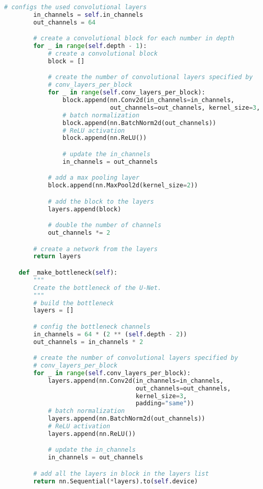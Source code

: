 \begin{lstlisting}[language=Python, caption={U-Net architecture for semantic segmentation}]
        # configs the used convolutional layers
        in_channels = self.in_channels
        out_channels = 64

        # create a convolutional block for each number in depth
        for _ in range(self.depth - 1):
            # create a convolutional block
            block = []

            # create the number of convolutional layers specified by
            # conv_layers_per_block
            for _ in range(self.conv_layers_per_block):
                block.append(nn.Conv2d(in_channels=in_channels,
                             out_channels=out_channels, kernel_size=3, padding="same"))
                # batch normalization
                block.append(nn.BatchNorm2d(out_channels))
                # ReLU activation
                block.append(nn.ReLU())

                # update the in_channels
                in_channels = out_channels

            # add a max pooling layer
            block.append(nn.MaxPool2d(kernel_size=2))

            # add the block to the layers
            layers.append(block)

            # double the number of channels
            out_channels *= 2

        # create a network from the layers
        return layers

    def _make_bottleneck(self):
        """
        Create the bottleneck of the U-Net.
        """
        # build the bottleneck
        layers = []

        # config the bottleneck channels
        in_channels = 64 * (2 ** (self.depth - 2))
        out_channels = in_channels * 2

        # create the number of convolutional layers specified by
        # conv_layers_per_block
        for _ in range(self.conv_layers_per_block):
            layers.append(nn.Conv2d(in_channels=in_channels,
                                    out_channels=out_channels,
                                    kernel_size=3,
                                    padding="same"))
            # batch normalization
            layers.append(nn.BatchNorm2d(out_channels))
            # ReLU activation
            layers.append(nn.ReLU())

            # update the in_channels
            in_channels = out_channels

        # add all the layers in block in the layers list
        return nn.Sequential(*layers).to(self.device)


\end{lstlisting}

